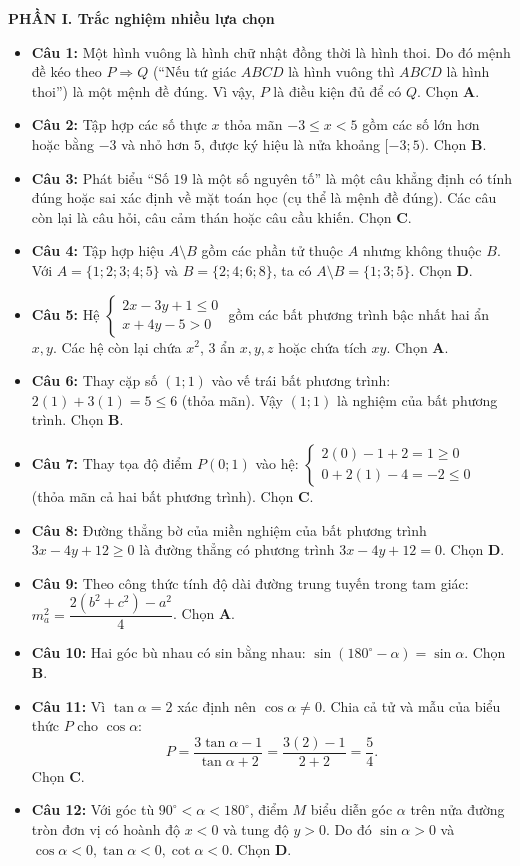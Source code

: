 \documentclass[12pt,a4paper]{article}
\begin{document}
\textbf{PHẦN I. Trắc nghiệm nhiều lựa chọn}
\begin{itemize}[leftmargin=0.6cm, itemsep=3pt]
    \item \textbf{Câu 1:} Một hình vuông là hình chữ nhật đồng thời là hình thoi. Do đó mệnh đề kéo theo $P \Rightarrow Q$ (``Nếu tứ giác $ABCD$ là hình vuông thì $ABCD$ là hình thoi'') là một mệnh đề đúng. Vì vậy, $P$ là điều kiện đủ để có $Q$. Chọn \textbf{A}.
    \item \textbf{Câu 2:} Tập hợp các số thực $x$ thỏa mãn $-3 \le x < 5$ gồm các số lớn hơn hoặc bằng $-3$ và nhỏ hơn $5$, được ký hiệu là nửa khoảng $[-3; 5)$. Chọn \textbf{B}.
    \item \textbf{Câu 3:} Phát biểu ``Số $19$ là một số nguyên tố'' là một câu khẳng định có tính đúng hoặc sai xác định về mặt toán học (cụ thể là mệnh đề đúng). Các câu còn lại là câu hỏi, câu cảm thán hoặc câu cầu khiến. Chọn \textbf{C}.
    \item \textbf{Câu 4:} Tập hợp hiệu $A \setminus B$ gồm các phần tử thuộc $A$ nhưng không thuộc $B$. Với $A = \{1; 2; 3; 4; 5\}$ và $B = \{2; 4; 6; 8\}$, ta có $A \setminus B = \{1; 3; 5\}$. Chọn \textbf{D}.
    \item \textbf{Câu 5:} Hệ $\begin{cases} 2x - 3y + 1 \le 0 \\ x + 4y - 5 > 0 \end{cases}$ gồm các bất phương trình bậc nhất hai ẩn $x, y$. Các hệ còn lại chứa $x^2$, 3 ẩn $x, y, z$ hoặc chứa tích $xy$. Chọn \textbf{A}.
    \item \textbf{Câu 6:} Thay cặp số $(1; 1)$ vào vế trái bất phương trình: $2(1) + 3(1) = 5 \le 6$ (thỏa mãn). Vậy $(1; 1)$ là nghiệm của bất phương trình. Chọn \textbf{B}.
    \item \textbf{Câu 7:} Thay tọa độ điểm $P(0; 1)$ vào hệ:
    $\begin{cases} 2(0) - 1 + 2 = 1 \ge 0 \\ 0 + 2(1) - 4 = -2 \le 0 \end{cases}$ (thỏa mãn cả hai bất phương trình). Chọn \textbf{C}.
    \item \textbf{Câu 8:} Đường thẳng bờ của miền nghiệm của bất phương trình $3x - 4y + 12 \ge 0$ là đường thẳng có phương trình $3x - 4y + 12 = 0$. Chọn \textbf{D}.
    \item \textbf{Câu 9:} Theo công thức tính độ dài đường trung tuyến trong tam giác: $m_a^2 = \dfrac{2(b^2 + c^2) - a^2}{4}$. Chọn \textbf{A}.
    \item \textbf{Câu 10:} Hai góc bù nhau có sin bằng nhau: $\sin(180^\circ - \alpha) = \sin \alpha$. Chọn \textbf{B}.
    \item \textbf{Câu 11:} Vì $\tan \alpha = 2$ xác định nên $\cos \alpha \ne 0$. Chia cả tử và mẫu của biểu thức $P$ cho $\cos \alpha$:
    \[
    P = \dfrac{3\tan \alpha - 1}{\tan \alpha + 2} = \dfrac{3(2) - 1}{2 + 2} = \dfrac{5}{4}.
    \]
    Chọn \textbf{C}.
    \item \textbf{Câu 12:} Với góc tù $90^\circ < \alpha < 180^\circ$, điểm $M$ biểu diễn góc $\alpha$ trên nửa đường tròn đơn vị có hoành độ $x < 0$ và tung độ $y > 0$. Do đó $\sin \alpha > 0$ và $\cos \alpha < 0, \tan \alpha < 0, \cot \alpha < 0$. Chọn \textbf{D}.
\end{itemize}
\end{document}
